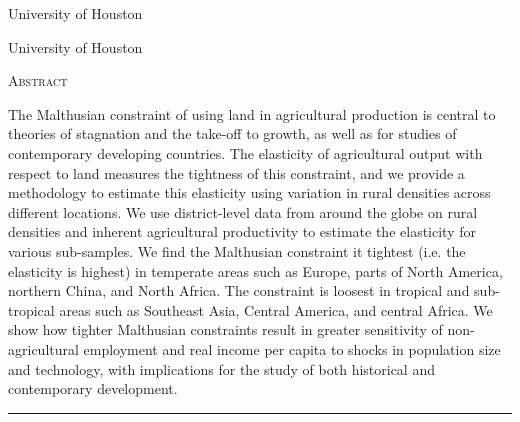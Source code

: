 \documentclass[11pt]{article}
\begin{document}
\begin{titlepage}
\vspace{2in} \noindent {\large \today}

\vspace{.5in} 

\vspace{.25in} 

\vspace{.05in} \noindent University of Houston

\vspace{.25in} 

\vspace{.05in} \noindent University of Houston

\vfill \noindent \textsc{Abstract} \hrulefill

\vspace{.05in} \noindent The Malthusian constraint of using land in agricultural production is central to theories of stagnation and the take-off to growth, as well as for studies of contemporary developing countries. The elasticity of agricultural output with respect to land measures the tightness of this constraint, and we provide a methodology to estimate this elasticity using variation in rural densities across different locations. We use district-level data from around the globe on rural densities and inherent agricultural productivity to estimate the elasticity for various sub-samples. We find the Malthusian constraint it tightest (i.e. the elasticity is highest) in temperate areas such as Europe, parts of North America, northern China, and North Africa. The constraint is loosest in tropical and sub-tropical areas such as Southeast Asia, Central America, and central Africa. We show how tighter Malthusian constraints result in greater sensitivity of non-agricultural employment and real income per capita to shocks in population size and technology, with implications for the study of both historical and contemporary development.

\vspace{.1in} \hrule

\vspace{.5in} 

\vspace{.1in} 

\vspace{.1in} 
\end{titlepage}
\end{document}
